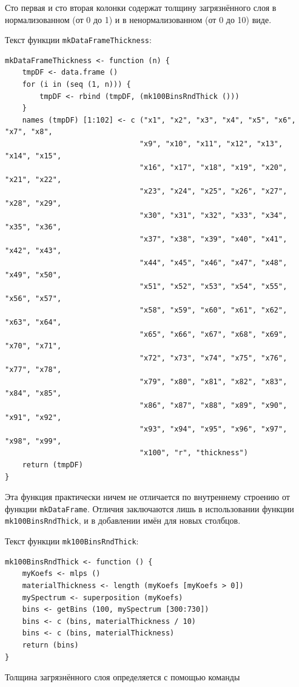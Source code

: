 \documentclass[12pt]{article}
\begin{document}
Сто первая и сто вторая колонки содержат толщину загрязнённого слоя в нормализованном (от 0 до 1) и в ненормализованном (от 0 до 10) виде.

Текст функции \verb|mkDataFrameThickness|:

\begin{verbatim}
mkDataFrameThickness <- function (n) {
    tmpDF <- data.frame ()
    for (i in (seq (1, n))) {
        tmpDF <- rbind (tmpDF, (mk100BinsRndThick ()))
    }
    names (tmpDF) [1:102] <- c ("x1", "x2", "x3", "x4", "x5", "x6", "x7", "x8",
                               "x9", "x10", "x11", "x12", "x13", "x14", "x15",
                               "x16", "x17", "x18", "x19", "x20", "x21", "x22",
                               "x23", "x24", "x25", "x26", "x27", "x28", "x29",
                               "x30", "x31", "x32", "x33", "x34", "x35", "x36",
                               "x37", "x38", "x39", "x40", "x41", "x42", "x43",
                               "x44", "x45", "x46", "x47", "x48", "x49", "x50",
                               "x51", "x52", "x53", "x54", "x55", "x56", "x57",
                               "x58", "x59", "x60", "x61", "x62", "x63", "x64",
                               "x65", "x66", "x67", "x68", "x69", "x70", "x71",
                               "x72", "x73", "x74", "x75", "x76", "x77", "x78",
                               "x79", "x80", "x81", "x82", "x83", "x84", "x85",
                               "x86", "x87", "x88", "x89", "x90", "x91", "x92",
                               "x93", "x94", "x95", "x96", "x97", "x98", "x99",
                               "x100", "r", "thickness")
    return (tmpDF)
}
\end{verbatim}

Эта функция практически ничем не отличается по внутреннему строению от функции \verb|mkDataFrame|. Отличия заключаются лишь в использовании функции \verb|mk100BinsRndThick|, и в добавлении имён для новых столбцов.

Текст функции \verb|mk100BinsRndThick|:

\begin{verbatim}
mk100BinsRndThick <- function () {
    myKoefs <- mlps ()
    materialThickness <- length (myKoefs [myKoefs > 0])
    mySpectrum <- superposition (myKoefs)
    bins <- getBins (100, mySpectrum [300:730])
    bins <- c (bins, materialThickness / 10)
    bins <- c (bins, materialThickness)
    return (bins)
}
\end{verbatim}

Толщина загрязнённого слоя определяется с помощью команды
\end{document}
